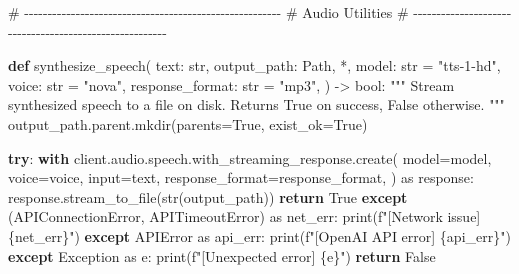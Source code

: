 \documentclass[
  letterpaper,
  DIV=11,
  numbers=noendperiod]{scrartcl}
\newenvironment{Shaded}{\begin{snugshade}}{\end{snugshade}}
\newcommand{\BuiltInTok}[1]{\textcolor[rgb]{0.00,0.23,0.31}{#1}}
\newcommand{\CommentTok}[1]{\textcolor[rgb]{0.37,0.37,0.37}{#1}}
\newcommand{\ControlFlowTok}[1]{\textcolor[rgb]{0.00,0.23,0.31}{\textbf{#1}}}
\newcommand{\ImportTok}[1]{\textcolor[rgb]{0.00,0.46,0.62}{#1}}
\newcommand{\KeywordTok}[1]{\textcolor[rgb]{0.00,0.23,0.31}{\textbf{#1}}}
\newcommand{\NormalTok}[1]{\textcolor[rgb]{0.00,0.23,0.31}{#1}}
\newcommand{\OperatorTok}[1]{\textcolor[rgb]{0.37,0.37,0.37}{#1}}
\newcommand{\PreprocessorTok}[1]{\textcolor[rgb]{0.68,0.00,0.00}{#1}}
\newcommand{\SpecialCharTok}[1]{\textcolor[rgb]{0.37,0.37,0.37}{#1}}
\newcommand{\SpecialStringTok}[1]{\textcolor[rgb]{0.13,0.47,0.30}{#1}}
\newcommand{\StringTok}[1]{\textcolor[rgb]{0.13,0.47,0.30}{#1}}
\newcommand{\VariableTok}[1]{\textcolor[rgb]{0.07,0.07,0.07}{#1}}
\begin{document}
\begin{Shaded}
\begin{Highlighting}[]
\CommentTok{\# {-}{-}{-}{-}{-}{-}{-}{-}{-}{-}{-}{-}{-}{-}{-}{-}{-}{-}{-}{-}{-}{-}{-}{-}{-}{-}{-}{-}{-}{-}{-}{-}{-}{-}{-}{-}{-}{-}{-}{-}{-}{-}{-}{-}{-}{-}{-}{-}{-}{-}{-}{-}{-}{-}{-}}
\CommentTok{\# Audio Utilities}
\CommentTok{\# {-}{-}{-}{-}{-}{-}{-}{-}{-}{-}{-}{-}{-}{-}{-}{-}{-}{-}{-}{-}{-}{-}{-}{-}{-}{-}{-}{-}{-}{-}{-}{-}{-}{-}{-}{-}{-}{-}{-}{-}{-}{-}{-}{-}{-}{-}{-}{-}{-}{-}{-}{-}{-}{-}{-}}

\KeywordTok{def}\NormalTok{ synthesize\_speech(}
\NormalTok{    text: }\BuiltInTok{str}\NormalTok{,}
\NormalTok{    output\_path: Path,}
    \OperatorTok{*}\NormalTok{,}
\NormalTok{    model: }\BuiltInTok{str} \OperatorTok{=} \StringTok{"tts{-}1{-}hd"}\NormalTok{,}
\NormalTok{    voice: }\BuiltInTok{str} \OperatorTok{=} \StringTok{"nova"}\NormalTok{,}
\NormalTok{    response\_format: }\BuiltInTok{str} \OperatorTok{=} \StringTok{"mp3"}\NormalTok{,}
\NormalTok{) }\OperatorTok{{-}\textgreater{}} \BuiltInTok{bool}\NormalTok{:}
    \CommentTok{"""}
\CommentTok{    Stream synthesized speech to a file on disk.}
\CommentTok{    Returns True on success, False otherwise.}
\CommentTok{    """}
\NormalTok{    output\_path.parent.mkdir(parents}\OperatorTok{=}\VariableTok{True}\NormalTok{, exist\_ok}\OperatorTok{=}\VariableTok{True}\NormalTok{)}

    \ControlFlowTok{try}\NormalTok{:}
        \ControlFlowTok{with}\NormalTok{ client.audio.speech.with\_streaming\_response.create(}
\NormalTok{            model}\OperatorTok{=}\NormalTok{model,}
\NormalTok{            voice}\OperatorTok{=}\NormalTok{voice,}
            \BuiltInTok{input}\OperatorTok{=}\NormalTok{text,}
\NormalTok{            response\_format}\OperatorTok{=}\NormalTok{response\_format,}
\NormalTok{        ) }\ImportTok{as}\NormalTok{ response:}
\NormalTok{            response.stream\_to\_file(}\BuiltInTok{str}\NormalTok{(output\_path))}
        \ControlFlowTok{return} \VariableTok{True}
    \ControlFlowTok{except}\NormalTok{ (APIConnectionError, APITimeoutError) }\ImportTok{as}\NormalTok{ net\_err:}
        \BuiltInTok{print}\NormalTok{(}\SpecialStringTok{f"[Network issue] }\SpecialCharTok{\{}\NormalTok{net\_err}\SpecialCharTok{\}}\SpecialStringTok{"}\NormalTok{)}
    \ControlFlowTok{except}\NormalTok{ APIError }\ImportTok{as}\NormalTok{ api\_err:}
        \BuiltInTok{print}\NormalTok{(}\SpecialStringTok{f"[OpenAI API error] }\SpecialCharTok{\{}\NormalTok{api\_err}\SpecialCharTok{\}}\SpecialStringTok{"}\NormalTok{)}
    \ControlFlowTok{except} \PreprocessorTok{Exception} \ImportTok{as}\NormalTok{ e:}
        \BuiltInTok{print}\NormalTok{(}\SpecialStringTok{f"[Unexpected error] }\SpecialCharTok{\{}\NormalTok{e}\SpecialCharTok{\}}\SpecialStringTok{"}\NormalTok{)}
    \ControlFlowTok{return} \VariableTok{False}


\end{Highlighting}
\end{Shaded}
\end{document}
